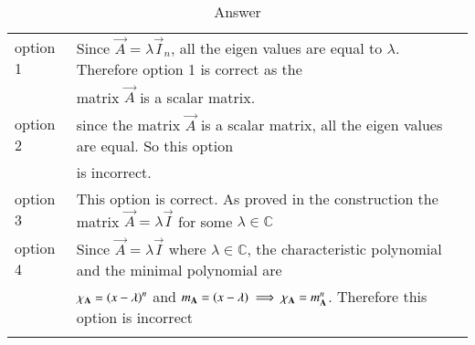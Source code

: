 \begin{longtable}{|l|l|}
    \hline
    option 1 & Since $\vec{A}=\lambda\vec{I}_n$, all the eigen values are equal to $\lambda$. Therefore option 1 is correct as the \\
    &matrix $\vec{A}$ is a scalar matrix.\\
    \hline
    option 2 & since the matrix $\vec{A}$ is a scalar matrix, all the eigen values are equal. So this option \\
    &is incorrect.\\
    \hline
    option 3 & This option is correct. As proved in the construction the matrix $\vec{A}=\lambda\vec{I}$ for some $\lambda \in \mathbb{C}$\\
    \hline
    option 4 & Since $\vec{A}=\lambda\vec{I}$ where $\lambda\in\mathbb{C}$, the characteristic polynomial and the minimal polynomial are\\
    & $\chi_\mathbf{A}=\left(x-\lambda\right)^n$ and $m_\mathbf{A}=\left(x-\lambda\right)\implies\chi_\mathbf{A}=m_\mathbf{A}^n$. Therefore this option is incorrect\\
    \hline
    \caption{Answer}
    \label{eq:solutions/2015/dec/77/tab:construction}
\end{longtable}
